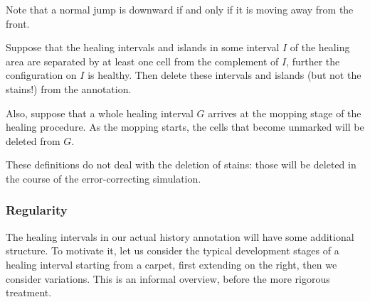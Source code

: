 \documentclass[12pt]{memoir}
\begin{document}
Note that a normal jump is downward if and only if it is moving away from the front.

\begin{definition}\label{def:shrinking} 
Suppose that the healing intervals and islands
in some interval \( I \) of the healing area are separated by at least one cell
from the complement of \( I \), further the configuration on \( I \) is healthy.
Then delete these intervals and islands (but not the stains!) from the annotation.

Also, suppose that a whole healing interval \( G \) arrives at the mopping stage
of the healing procedure.
As the mopping starts, the cells that become unmarked will be deleted from \( G \).

\end{definition}

These definitions do not deal with the deletion of stains: those will be deleted in the course
of the error-correcting simulation.


\subsubsection{Regularity}

The healing intervals in our actual history annotation will
have some additional structure.
To motivate it, let us consider the typical development stages of a healing
interval starting from a carpet, first extending on
the right, then we consider variations.
This is an informal overview, before the more rigorous treatment.
\end{document}
